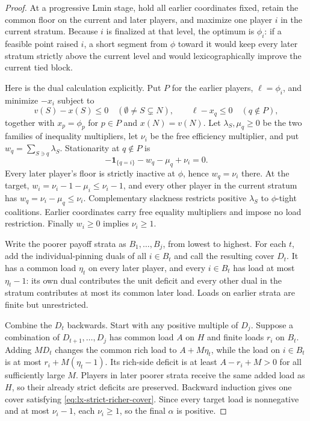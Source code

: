 \begin{proof}
At a progressive Lmin stage, hold all earlier coordinates fixed, retain the
common floor on the current and later players, and maximize one player $i$ in
the current stratum.  Because $i$ is finalized at that level, the optimum is
$\phi_i$: if a feasible point raised $i$, a short segment from $\phi$ toward
it would keep every later stratum strictly above the current level and would
lexicographically improve the current tied block.

Here is the dual calculation explicitly.  Put $P$ for the earlier players,
$\ell=\phi_i$, and minimize $-x_i$ subject to
\[
 v(S)-x(S)\leq0\quad(\emptyset\ne S\subsetneq N),
 \qquad \ell-x_q\leq0\quad(q\notin P),
\]
together with $x_p=\phi_p$ for $p\in P$ and $x(N)=v(N)$.  Let
$\lambda_S,\mu_q\geq0$ be the two families of inequality multipliers, let
$\nu_i$ be the free efficiency multiplier, and put
$w_q=\sum_{S\ni q}\lambda_S$.  Stationarity at $q\notin P$ is
\[
 -\mathbf1_{\{q=i\}}-w_q-\mu_q+\nu_i=0.             \tag{SC-D}
 \label{eq:lx-strict-cover-dual}
\]
Every later player's floor is strictly inactive at $\phi$, hence
$w_q=\nu_i$ there.  At the target,
$w_i=\nu_i-1-\mu_i\leq\nu_i-1$, and every other player in the current
stratum has $w_q=\nu_i-\mu_q\leq\nu_i$.  Complementary slackness restricts
positive $\lambda_S$ to $\phi$-tight coalitions.  Earlier coordinates carry
free equality multipliers and impose no load restriction.  Finally
$w_i\geq0$ implies $\nu_i\geq1$.

Write the poorer payoff strata as $B_1,\ldots,B_j$, from lowest to highest.
For each $t$, add the individual-pinning duals of all $i\in B_t$ and call the
resulting cover $D_t$.  It has a common load $\eta_t$ on every later player,
and every $i\in B_t$ has load at most $\eta_t-1$: its own dual contributes
the unit deficit and every other dual in the stratum contributes at most its
common later load.  Loads on earlier strata are finite but unrestricted.

Combine the $D_t$ backwards.  Start with any positive multiple of $D_j$.
Suppose a combination of $D_{t+1},\ldots,D_j$ has common load $A$ on $H$
and finite loads $r_i$ on $B_t$.  Adding $M D_t$ changes the common rich load
to $A+M\eta_t$, while the load on $i\in B_t$ is at most
$r_i+M(\eta_t-1)$.  Its rich-side deficit is at least
$A-r_i+M>0$ for all sufficiently large $M$.  Players in later poorer strata
receive the same added load as $H$, so their already strict deficits are
preserved.  Backward induction gives one cover satisfying
\eqref{eq:lx-strict-richer-cover}.  Since every target load is nonnegative
and at most $\nu_i-1$, each $\nu_i\geq1$, so the final $\alpha$ is positive.
\end{proof}

